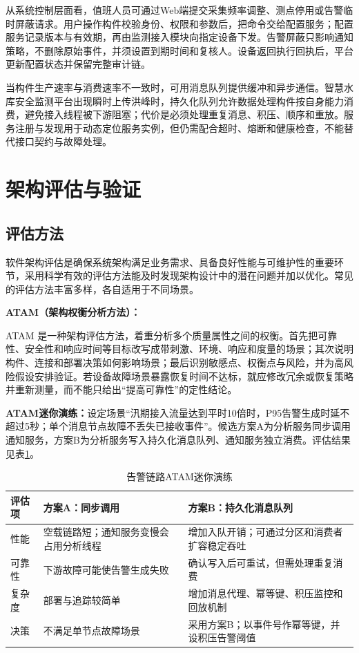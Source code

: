 从系统控制层面看，值班人员可通过Web端提交采集频率调整、测点停用或告警临时屏蔽请求。用户操作构件校验身份、权限和参数后，把命令交给配置服务；配置服务记录版本与有效期，再由监测接入模块向指定设备下发。告警屏蔽只影响通知策略，不删除原始事件，并须设置到期时间和复核人。设备返回执行回执后，平台更新配置状态并保留完整审计链。

当构件生产速率与消费速率不一致时，可用消息队列提供缓冲和异步通信。智慧水库安全监测平台出现瞬时上传洪峰时，持久化队列允许数据处理构件按自身能力消费，避免接入线程被下游阻塞；代价是必须处理重复消息、积压、顺序和重放。服务注册与发现用于动态定位服务实例，但仍需配合超时、熔断和健康检查，不能替代接口契约与故障处理。

\section{架构评估与验证}

\subsection{评估方法}

软件架构评估是确保系统架构满足业务需求、具备良好性能与可维护性的重要环节，采用科学有效的评估方法能及时发现架构设计中的潜在问题并加以优化。常见的评估方法丰富多样，各自适用于不同场景。

\textbf{ATAM（架构权衡分析方法）：}

ATAM 是一种架构评估方法，着重分析多个质量属性之间的权衡。首先把可靠性、安全性和响应时间等目标改写成带刺激、环境、响应和度量的场景；其次说明构件、连接和部署决策如何影响场景；最后识别敏感点、权衡点与风险，并为高风险假设安排验证。若设备故障场景暴露恢复时间不达标，就应修改冗余或恢复策略并重新测量，而不能只给出“提高可靠性”的定性结论。

\textbf{ATAM迷你演练：}设定场景“汛期接入流量达到平时10倍时，P95告警生成时延不超过5秒；单个消息节点故障不丢失已接收事件”。候选方案A为分析服务同步调用通知服务，方案B为分析服务写入持久化消息队列、通知服务独立消费。评估结果见表\ref{tab:atam-mini}。

\begin{table}[htbp]
\centering
\caption{告警链路ATAM迷你演练}\label{tab:atam-mini}
\begin{tabular}{p{2.2cm}p{4.7cm}p{5.0cm}}
\toprule
评估项 & 方案A：同步调用 & 方案B：持久化消息队列 \\
\midrule
性能 & 空载链路短；通知服务变慢会占用分析线程 & 增加入队开销；可通过分区和消费者扩容稳定吞吐 \\
可靠性 & 下游故障可能使告警生成失败 & 确认写入后可重试，但需处理重复消费 \\
复杂度 & 部署与追踪较简单 & 增加消息代理、幂等键、积压监控和回放机制 \\
决策 & 不满足单节点故障场景 & 采用方案B；以事件号作幂等键，并设积压告警阈值 \\
\bottomrule
\end{tabular}
\end{table}

